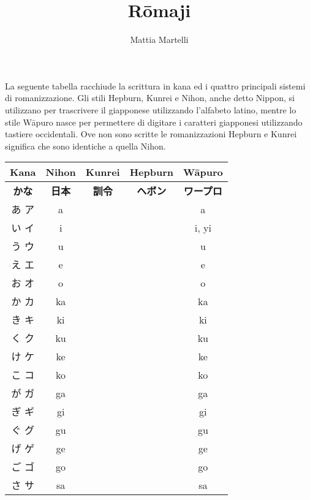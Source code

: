 \documentclass{article}
\title{R\={o}maji}
\author{Mattia Martelli}
\date{}
\begin{document}
    \maketitle

    La seguente tabella racchiude la scrittura in kana ed i quattro principali sistemi di romanizzazione. Gli stili
    Hepburn, Kunrei e Nihon, anche detto Nippon, si utilizzano per trascrivere il giapponese utilizzando l'alfabeto
    latino, mentre lo stile W\={a}puro nasce per permettere di digitare i caratteri giapponesi utilizzando tastiere
    occidentali. Ove non sono scritte le romanizzazioni Hepburn e Kunrei significa che sono identiche a quella
    Nihon.

        \begin{center}
            \begin{japanese}
            \begin{longtable}{|c|c c c|c|}
                \hline
                \textitalian{\textbf{Kana}} & \textitalian{\textbf{Nihon}} & \textitalian{\textbf{Kunrei}} & \textitalian{\textbf{Hepburn}} & \textitalian{\textbf{Wāpuro}} \\ \hline
                \textbf{かな} & \textbf{日本} & \textbf{訓令} & \textbf{ヘボン} & \textbf{ワープロ} \\ \hline\hline
                あ ア & a &&& a \\ \hline
                い イ & i &&& i, yi \\ \hline
                う ウ & u &&& u \\ \hline
                え エ & e &&& e \\ \hline
                お オ & o &&& o \\ \hline
                か カ & ka &&& ka \\ \hline
                き キ & ki &&& ki \\ \hline
                く ク & ku &&& ku \\ \hline
                け ケ & ke &&& ke \\ \hline
                こ コ & ko &&& ko \\ \hline
                が ガ & ga &&& ga \\ \hline
                ぎ ギ & gi &&& gi \\ \hline
                ぐ グ & gu &&& gu \\ \hline
                げ ゲ & ge &&& ge \\ \hline
                ご ゴ & go &&& go \\ \hline
                さ サ & sa &&& sa \\ \hline

\end{longtable}
\end{japanese}
\end{center}
\end{document}
